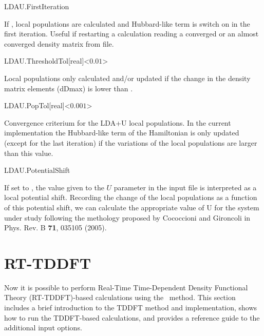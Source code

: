 \begin{fdflogicalF}{LDAU.FirstIteration}
  
  If \fdftrue, local populations are calculated and Hubbard-like term
  is switch on in the first iteration.  Useful if restarting a
  calculation reading a converged or an almost converged density
  matrix from file.

\end{fdflogicalF}

\begin{fdfentry}{LDAU.ThresholdTol}[real]<$0.01$>
  
  Local populations only calculated and/or updated if the change in the
  density matrix elements (dDmax) is lower than .

\end{fdfentry}

\begin{fdfentry}{LDAU.PopTol}[real]<$0.001$>
  
  Convergence criterium for the LDA+U local populations.  In the
  current implementation the Hubbard-like term of the Hamiltonian is
  only updated (except for the last iteration) if the variations of
  the local populations are larger than this value.

\end{fdfentry}

\begin{fdflogicalF}{LDAU.PotentialShift}

  If set to \fdftrue, the value given to the $U$ parameter in the
  input file is interpreted as a local potential shift. Recording the
  change of the local populations as a function of this potential
  shift, we can calculate the appropriate value of U for the system
  under study following the methology proposed by Cococcioni and
  Gironcoli in Phys. Rev. B \textbf{71}, 035105 (2005).

\end{fdflogicalF}

\section{RT-TDDFT}\label{sec:tddft}
Now it is possible to perform Real-Time Time-Dependent Density
Functional Theory (RT-TDDFT)-based calculations using the
\siesta\ method. This section includes a brief introduction to the
TDDFT method and implementation, shows how to run the TDDFT-based
calculations, and provides a reference guide to the additional input
options.

